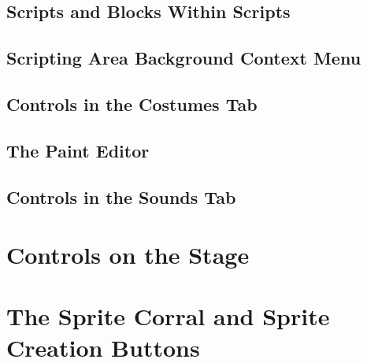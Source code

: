 \documentclass{report}
\begin{document}
\subsection{Scripts and Blocks Within Scripts}
\subsection{Scripting Area Background Context Menu}
\subsection{Controls in the Costumes Tab}
\subsection{The Paint Editor}
\subsection{Controls in the Sounds Tab}
\section{Controls on the Stage}
\section{The Sprite Corral and Sprite Creation Buttons}
\end{document}
